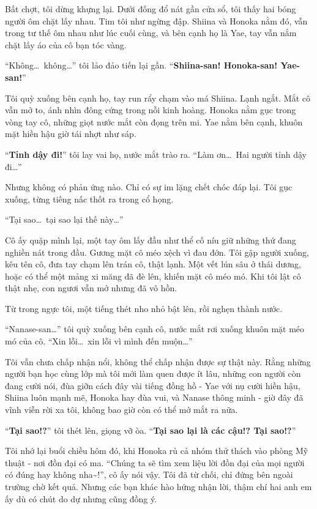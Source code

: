 \documentclass[../main.tex]{subfiles}
\begin{document}
Bất chợt, tôi dừng khựng lại. Dưới đống đổ nát gần cửa sổ, tôi thấy hai bóng người ôm chặt lấy nhau. Tim tôi như ngừng đập. Shiina và Honoka nằm đó, vẫn trong tư thế ôm nhau như lúc cuối cùng, và bên cạnh họ là Yae, tay vẫn nắm chặt lấy áo của cô bạn tóc vàng.

``Không\dots\ không\dots'' tôi lảo đảo tiến lại gần. ``\textbf{Shiina-san! Honoka-san! Yae-san!}''

Tôi quỳ xuống bên cạnh họ, tay run rẩy chạm vào má Shiina. Lạnh ngắt. Mắt cô vẫn mở to, ánh nhìn đông cứng trong nỗi kinh hoàng. Honoka nằm gục trong vòng tay cô, những giọt nước mắt còn đọng trên mi. Yae nằm bên cạnh, khuôn mặt hiền hậu giờ tái nhợt như sáp.

``\textbf{Tỉnh dậy đi!}'' tôi lay vai họ, nước mắt trào ra. ``Làm ơn\dots\ Hai người tỉnh dậy đi\dots''

Nhưng không có phản ứng nào. Chỉ có sự im lặng chết chóc đáp lại. Tôi gục xuống, từng tiếng nấc thốt ra trong cổ họng.

``Tại sao\dots\ tại sao lại thế này\dots''

Cô ấy quặp mình lại, một tay ôm lấy đầu như thể cố níu giữ những thứ đang nghiền nát trong đầu. Gương mặt cô méo xệch vì đau đớn. Tôi gập người xuống, kêu tên cô, đưa tay chạm lên trán cô, thật lạnh. Một vết lún sâu ở thái dương, hoặc có thể một mảng xi măng đã đè lên, khiến mặt cô méo mó. Khi tôi lật cô thật nhẹ, con ngươi vẫn mở nhưng đã vô hồn.

Từ trong ngực tôi, một tiếng thét nho nhỏ bật lên, rồi nghẹn thành nước.

``Nanase-san\dots'' tôi quỳ xuống bên cạnh cô, nước mắt rơi xuống khuôn mặt méo mó của cô. ``Xin lỗi\dots\ xin lỗi vì mình đến muộn\dots''

Tôi vẫn chưa chấp nhận nổi, không thể chấp nhận được sự thật này. Rằng những người bạn học cùng lớp mà tôi mới làm quen được ít lâu, những con người còn đang cười nói, đùa giỡn cách đây vài tiếng đồng hồ - Yae với nụ cười hiền hậu, Shiina luôn mạnh mẽ, Honoka hay đùa vui, và Nanase thông minh - giờ đây đã vĩnh viễn rời xa tôi, không bao giờ còn có thể mở mắt ra nữa.

``\textbf{Tại sao!?}'' tôi thét lên, giọng vỡ òa. ``\textbf{Tại sao lại là các cậu!? Tại sao!?}''

Tôi nhớ lại buổi chiều hôm đó, khi Honoka rủ cả nhóm thử thách vào phòng Mỹ thuật - nơi đồn đại có ma. ``Chúng ta sẽ tìm xem liệu lời đồn đại của mọi người có đúng hay không nha\~{}!'', cô ấy nói vậy. Tôi đã từ chối, chỉ đứng bên ngoài trường chờ kết quả. Nhưng các bạn khác hào hứng nhận lời, thậm chí hai anh em ấy dù có chút do dự nhưng cũng đồng ý.
\end{document}
